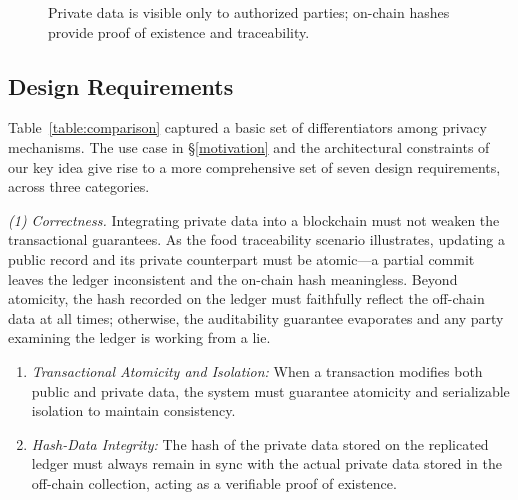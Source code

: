 \begin{figure}[t]
\centering
\small
\resizebox{\columnwidth}{!}{}
\vspace{-0.5cm}
\caption{Private data is visible only to authorized parties; on-chain hashes provide proof of existence and traceability.}
\label{fig:fsc-pvt-data-food-traceability}
\vspace{-0.5cm}
\end{figure}

\subsection{Design Requirements}
Table~\ref{table:comparison} captured a basic set of differentiators among privacy mechanisms. The use case in \S\ref{motivation} and the architectural constraints of our key idea give rise to a more comprehensive set of seven design requirements, across three categories.

\noindent\textit{(1) Correctness.} Integrating private data into a blockchain must not weaken the transactional guarantees. As the food traceability scenario illustrates, updating a public record and its private counterpart must be atomic---a partial commit leaves the ledger inconsistent and the on-chain hash meaningless. Beyond atomicity, the hash recorded on the ledger must faithfully reflect the off-chain data at all times; otherwise, the auditability guarantee evaporates and any party examining the ledger is working from a lie.
\begin{enumerate}[topsep=0pt,noitemsep,leftmargin=15pt]
\item[\textbf{R1}] \textit{Transactional Atomicity and Isolation:} When a transaction modifies both public and private data, the system must guarantee atomicity and serializable isolation to maintain consistency.
\item[\textbf{R2}] \textit{Hash-Data Integrity:} The hash of the private data stored on the replicated ledger must always remain in sync with the actual private data stored in the off-chain collection, acting as a verifiable proof of existence.
\end{enumerate}

